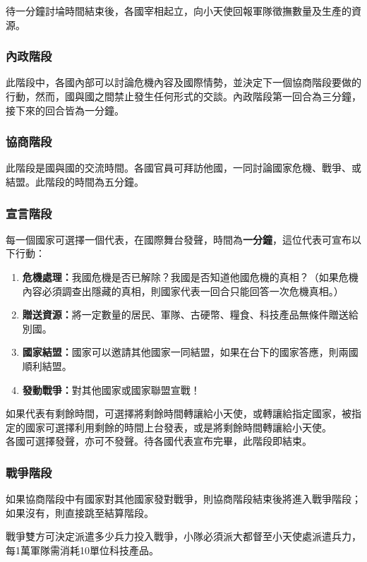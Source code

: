 待一分鐘討埨時間結束後，各國宰相起立，向小天使回報軍隊徵撫數量及生產的資源。

\subsubsection{內政階段}
此階段中，各國內部可以討論危機內容及國際情勢，並決定下一個協商階段要做的行動，然而，國與國之間禁止發生任何形式的交談。內政階段第一回合為三分鐘，接下來的回合皆為一分鐘。

\subsubsection{協商階段}
此階段是國與國的交流時間。各國官員可拜訪他國，一同討論國家危機、戰爭、或結盟。此階段的時間為五分鐘。

\subsubsection{宣言階段}
每一個國家可選擇一個代表，在國際舞台發聲，時間為\textbf{一分鐘}，這位代表可宣布以下行動：\\

\begin{enumerate}
    \item \textbf{危機處理：}我國危機是否已解除？我國是否知道他國危機的真相？（如果危機內容必須調查出隱藏的真相，則國家代表一回合只能回答一次危機真相。）
    \item \textbf{贈送資源：}將一定數量的居民、軍隊、古硬幣、糧食、科技產品無條件贈送給別國。
    \item \textbf{國家結盟：}國家可以邀請其他國家一同結盟，如果在台下的國家答應，則兩國順利結盟。
    \item \textbf{發動戰爭：}對其他國家或國家聯盟宣戰！
\end{enumerate}

如果代表有剩餘時間，可選擇將剩餘時間轉讓給小天使，或轉讓給指定國家，被指定的國家可選擇利用剩餘的時間上台發表，或是將剩餘時間轉讓給小天使。\\

各國可選擇發聲，亦可不發聲。待各國代表宣布完畢，此階段即結束。

\subsubsection{戰爭階段}
如果協商階段中有國家對其他國家發對戰爭，則協商階段結束後將進入戰爭階段；如果沒有，則直接跳至結算階段。

戰爭雙方可決定派遣多少兵力投入戰爭，小隊必須派大都督至小天使處派遣兵力，每1萬軍隊需消耗10單位科技產品。

